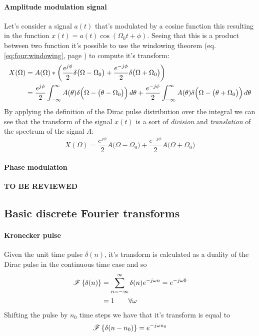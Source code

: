 	\paragraph{Amplitude modulation signal} Let's consider a signal $a(t)$ that's modulated by a cosine function this resulting in the function $x(t) = a(t) \cos(\Omega_0t + \phi)$. Seeing that this is a product between two function it's possible to use the windowing theorem (eq. \ref{eq:four:windowing}, page \pageref{eq:four:windowing}) to compute it's transform:
	\begin{align*}
		X(\Omega) & = A(\Omega) * \left( \frac{e^{j\phi}}{2} \delta\big(\Omega-\Omega_0\big) + \frac{e^{-j\phi}}{2}\delta\big(\Omega+\Omega_0\big) \right) \\
		& = \frac{e^{j\phi}}{2} \int_{-\infty}^\infty A(\theta) \delta\Big( \Omega - \big(\theta - \Omega_0\big) \Big) \, d\theta + \frac{e^{-j\phi}}{2} \int_{-\infty}^\infty A(\theta) \delta\Big( \Omega - \big(\theta + \Omega_0\big) \Big) \, d\theta
	\end{align*}
	By applying the definition of the Dirac pulse distribution over the integral we can see that the transform of the signal $x(t)$ is a sort of \textit{division} and \textit{translation} of the spectrum of the signal $A$:
	\[ X(\Omega) = \frac{e^{j\phi}}{2} A\big(\Omega-\Omega_0\big) + \frac{e^{-j\phi}}{2} A\big(\Omega+\Omega_0\big) \]
	
	\paragraph{Phase modulation} \textbf{TO BE REVIEWED}
	
	
	\subsection*{Basic discrete Fourier transforms}
		\paragraph{Kronecker pulse} Given the unit time pulse $\delta (n)$, it's transform is calculated as a duality of the Dirac pulse in the continuous time case and so
		\begin{align*}
			\mathscr{F}\left\{ \delta(n) \right\} & = \sum_{n=-\infty}^\infty \delta(n) e^{-j\omega n} = e^{-j\omega 0} \\&= 1 \qquad \forall \omega
		\end{align*}
		Shifting the pulse by $n_0$ time steps we have that it's transform is equal to
		\[ \mathscr{F}\left\{ \delta(n-n_0) \right\} = e^{-j\omega n_0}\]
		
